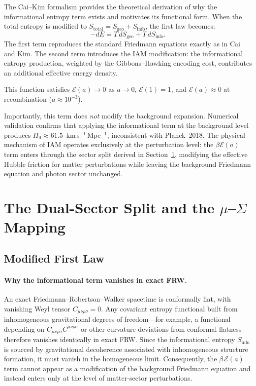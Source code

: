 \documentclass[11pt]{article}
\begin{document}
The Cai--Kim formalism provides the theoretical derivation of why the
informational entropy term exists and motivates its functional form.  When
the total entropy is modified to $S_\mathrm{total} = S_\mathrm{geo} + S_\mathrm{info}$,
the first law becomes:
\begin{equation}
-dE = T\,dS_\mathrm{geo} + T\,dS_\mathrm{info}.
\end{equation}
The first term reproduces the standard Friedmann equations exactly as in
Cai and Kim.  The second term introduces the IAM modification: the
informational entropy production, weighted by the Gibbons--Hawking encoding
cost, contributes an additional effective energy density.

This function satisfies $\mathcal{E}(a) \to 0$ as $a \to 0$,
$\mathcal{E}(1) = 1$, and $\mathcal{E}(a) \approx 0$ at recombination
($a \approx 10^{-3}$).

Importantly, this term does \emph{not} modify the background expansion.
Numerical validation confirms that applying the informational term at the
background level produces $H_0 \approx 61.5$~km\,s$^{-1}$\,Mpc$^{-1}$,
inconsistent with Planck~2018.  The physical mechanism of IAM operates
exclusively at the perturbation level: the $\beta\mathcal{E}(a)$ term
enters through the sector split derived in Section~\ref{sec:dual_sector},
modifying the effective Hubble friction for matter perturbations while
leaving the background Friedmann equation and photon sector unchanged.


\section{The Dual-Sector Split and the $\mu$--$\Sigma$ Mapping}
\label{sec:dual_sector}

\subsection{Modified First Law}

\paragraph{Why the informational term vanishes in exact FRW.}
An exact Friedmann--Robertson--Walker spacetime is conformally flat, with vanishing
Weyl tensor $C_{\mu\nu\rho\sigma}=0$. Any covariant entropy functional built from
inhomogeneous gravitational degrees of freedom---for example, a functional depending
on $C_{\mu\nu\rho\sigma}C^{\mu\nu\rho\sigma}$ or other curvature deviations from
conformal flatness---therefore vanishes identically in exact FRW. Since the
informational entropy $S_{\mathrm{info}}$ is sourced by gravitational decoherence
associated with inhomogeneous structure formation, it must vanish in the homogeneous
limit. Consequently, the $\beta\,\mathcal{E}(a)$ term cannot appear as a modification
of the background Friedmann equation and instead enters only at the level of
matter-sector perturbations.
\end{document}
